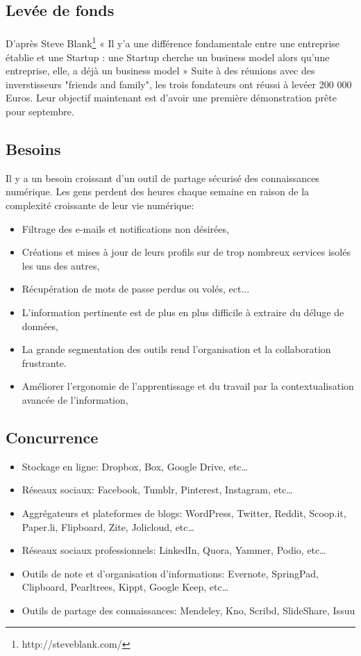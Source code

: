 \subsection{Levée de fonds}
\paragraph{}
D'après Steve Blank\footnote{http://steveblank.com/} « Il y'a une différence fondamentale entre une entreprise établie et 
une Startup : une Startup cherche un business model alors qu’une entreprise, elle, a déjà un 
business model »\newline
Suite à des réunions avec des inverstisseurs "friends and family", les trois fondateurs ont réussi à levéer 200 000 Euros.
Leur objectif maintenant est d'avoir une première démonstration prête pour septembre.
\subsection{Besoins}
Il y a un besoin croissant d'un outil de partage sécurisé des connaissances numérique. Les gens perdent des heures chaque semaine en raison de la complexité croissante de leur vie numérique:
\begin{itemize}
\item Filtrage des e-mails et notifications non désirées,
\item Créations et mises à jour de leurs profils sur de trop nombreux services isolés les uns des autres,
\item Récupération de mots de passe perdus ou volés, ect...
\item L'information pertinente est de plus en plus difficile à extraire du déluge de données,
\item La grande segmentation des outils rend l'organisation et la collaboration frustrante.
\item Améliorer l'ergonomie de l'apprentissage et du travail par la contextualisation avancée de l'information,

\end{itemize}
\subsection{Concurrence}
\begin{itemize}
\item Stockage en ligne: Dropbox, Box, Google Drive, etc…
\item Réseaux sociaux: Facebook, Tumblr, Pinterest, Instagram, etc…
\item Aggrégateurs et plateformes de blogs: WordPress, Twitter, Reddit, Scoop.it, Paper.li, Flipboard, Zite, Jolicloud, etc…
\item Réseaux sociaux professionnels: LinkedIn, Quora, Yammer, Podio, etc…
\item Outils de note et d'organisation d'informations: Evernote, SpringPad, Clipboard, Pearltrees, Kippt, Google Keep, etc…
\item Outils de partage des connaissances: Mendeley, Kno, Scribd, SlideShare, Issuu

\end{itemize}
